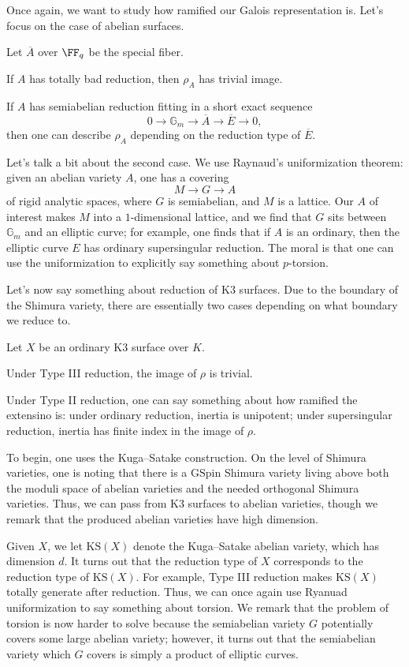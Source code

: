 \documentclass{article}
\begin{document}
Once again, we want to study how ramified our Galois representation is. Let's focus on the case of abelian surfaces.
\begin{theorem}
	Let $\overline A$ over $\FF_q$ be the special fiber.
	\begin{listalph}
		\item If $A$ has totally bad reduction, then $\rho_A$ has trivial image.
		\item If $A$ has semiabelian reduction fitting in a short exact sequence
		\[0\to\mathbb G_m\to\overline A\to\overline E\to0,\]
		then one can describe $\rho_A$ depending on the reduction type of $\overline E$.
	\end{listalph}
\end{theorem}
Let's talk a bit about the second case. We use Raynaud's uniformization theorem: given an abelian variety $A$, one has a covering
\[M\to G\to A\]
of rigid analytic spaces, where $G$ is semiabelian, and $M$ is a lattice. Our $A$ of interest makes $M$ into a $1$-dimensional lattice, and we find that $G$ sits between $\mathbb G_m$ and an elliptic curve; for example, one finds that if $A$ is an ordinary, then the elliptic curve $E$ has ordinary supersingular reduction. The moral is that one can use the uniformization to explicitly say something about $p$-torsion.

Let's now say something about reduction of K3 surfaces. Due to the boundary of the Shimura variety, there are essentially two cases depending on what boundary we reduce to.
\begin{theorem}
	Let $X$ be an ordinary K3 surface over $K$.
	\begin{listalph}
		\item Under Type III reduction, the image of $\rho$ is trivial.
		\item Under Type II reduction, one can say something about how ramified the extensino is: under ordinary reduction, inertia is unipotent; under supersingular reduction, inertia has finite index in the image of $\rho$.
	\end{listalph}
\end{theorem}
To begin, one uses the Kuga--Satake construction. On the level of Shimura varieties, one is noting that there is a $\mathrm{GSpin}$ Shimura variety living above both the moduli space of abelian varieties and the needed orthogonal Shimura varieties. Thus, we can pass from K3 surfaces to abelian varieties, though we remark that the produced abelian varieties have high dimension.

Given $X$, we let $\mathrm{KS}(X)$ denote the Kuga--Satake abelian variety, which has dimension $d$. It turns out that the reduction type of $X$ corresponds to the reduction type of $\mathrm{KS}(X)$. For example, Type III reduction makes $\mathrm{KS}(X)$ totally generate after reduction. Thus, we can once again use Ryanuad uniformization to say something about torsion. We remark that the problem of torsion is now harder to solve because the semiabelian variety $G$ potentially covers some large abelian variety; however, it turns out that the semiabelian variety which $G$ covers is simply a product of elliptic curves.
\end{document}
